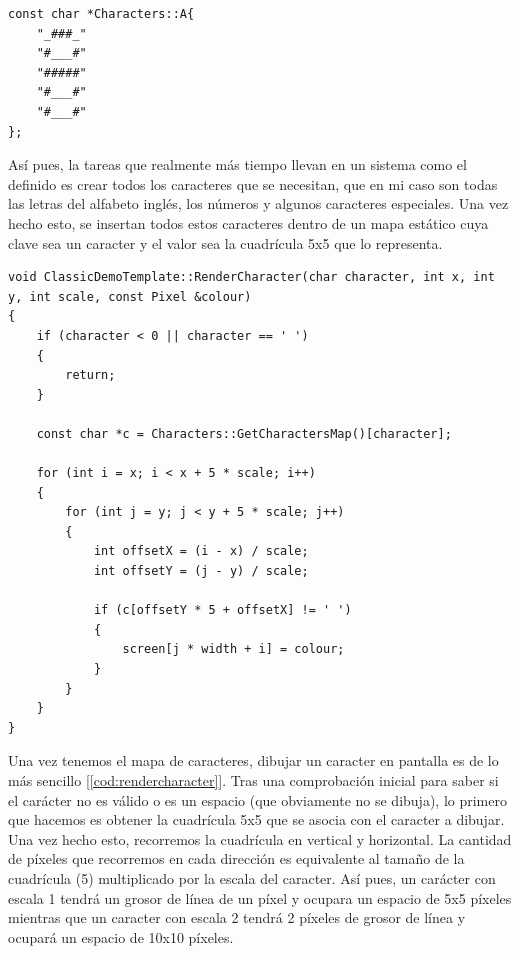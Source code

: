 \begin{lstlisting}[style=C-color, caption={Método que renderiza un sólo caracter},label=cod:fontA]
const char *Characters::A{
    "_###_"
    "#___#"
    "#####"
    "#___#"
    "#___#"
};
\end{lstlisting}

Así pues, la tareas que realmente más tiempo llevan en un sistema como el definido es crear todos los caracteres que se necesitan, que en mi caso son todas las letras del alfabeto inglés, los números y algunos caracteres especiales. Una vez hecho esto, se insertan todos estos caracteres dentro de un mapa estático cuya clave sea un caracter y el valor sea la cuadrícula 5x5 que lo representa.\\

\begin{lstlisting}[style=C-color, caption={Método que renderiza un sólo caracter},label=cod:rendercharacter]
void ClassicDemoTemplate::RenderCharacter(char character, int x, int y, int scale, const Pixel &colour)
{
    if (character < 0 || character == ' ')
    {
        return;
    }

    const char *c = Characters::GetCharactersMap()[character];

    for (int i = x; i < x + 5 * scale; i++)
    {
        for (int j = y; j < y + 5 * scale; j++)
        {
            int offsetX = (i - x) / scale;
            int offsetY = (j - y) / scale;

            if (c[offsetY * 5 + offsetX] != ' ')
            {
                screen[j * width + i] = colour;
            }
        }
    }
}
\end{lstlisting}

Una vez tenemos el mapa de caracteres, dibujar un caracter en pantalla es de lo más sencillo [\ref{cod:rendercharacter}]. Tras una comprobación inicial para saber si el carácter no es válido o es un espacio (que obviamente no se dibuja), lo primero que hacemos es obtener la cuadrícula 5x5 que se asocia con el caracter a dibujar.\\

Una vez hecho esto, recorremos la cuadrícula en vertical y horizontal. La cantidad de píxeles que recorremos en cada dirección es equivalente al tamaño de la cuadrícula (5) multiplicado por la escala del caracter. Así pues, un carácter con escala 1 tendrá un grosor de línea de un píxel y ocupara un espacio de 5x5 píxeles mientras que un caracter con escala 2 tendrá 2 píxeles de grosor de línea y ocupará un espacio de 10x10 píxeles.\\

